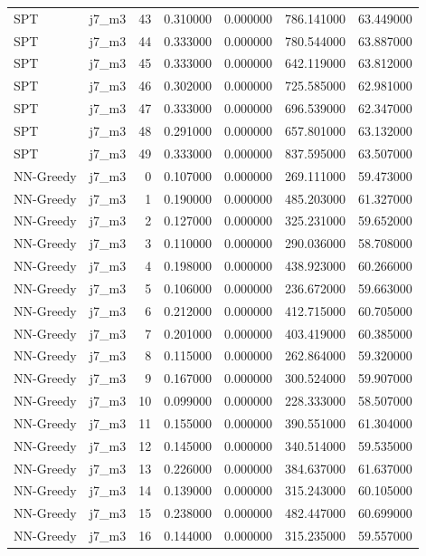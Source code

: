 \begin{tabular}{llrrrrr}
SPT & j7_m3 & 43 & 0.310000 & 0.000000 & 786.141000 & 63.449000 \\
SPT & j7_m3 & 44 & 0.333000 & 0.000000 & 780.544000 & 63.887000 \\
SPT & j7_m3 & 45 & 0.333000 & 0.000000 & 642.119000 & 63.812000 \\
SPT & j7_m3 & 46 & 0.302000 & 0.000000 & 725.585000 & 62.981000 \\
SPT & j7_m3 & 47 & 0.333000 & 0.000000 & 696.539000 & 62.347000 \\
SPT & j7_m3 & 48 & 0.291000 & 0.000000 & 657.801000 & 63.132000 \\
SPT & j7_m3 & 49 & 0.333000 & 0.000000 & 837.595000 & 63.507000 \\
NN-Greedy & j7_m3 & 0 & 0.107000 & 0.000000 & 269.111000 & 59.473000 \\
NN-Greedy & j7_m3 & 1 & 0.190000 & 0.000000 & 485.203000 & 61.327000 \\
NN-Greedy & j7_m3 & 2 & 0.127000 & 0.000000 & 325.231000 & 59.652000 \\
NN-Greedy & j7_m3 & 3 & 0.110000 & 0.000000 & 290.036000 & 58.708000 \\
NN-Greedy & j7_m3 & 4 & 0.198000 & 0.000000 & 438.923000 & 60.266000 \\
NN-Greedy & j7_m3 & 5 & 0.106000 & 0.000000 & 236.672000 & 59.663000 \\
NN-Greedy & j7_m3 & 6 & 0.212000 & 0.000000 & 412.715000 & 60.705000 \\
NN-Greedy & j7_m3 & 7 & 0.201000 & 0.000000 & 403.419000 & 60.385000 \\
NN-Greedy & j7_m3 & 8 & 0.115000 & 0.000000 & 262.864000 & 59.320000 \\
NN-Greedy & j7_m3 & 9 & 0.167000 & 0.000000 & 300.524000 & 59.907000 \\
NN-Greedy & j7_m3 & 10 & 0.099000 & 0.000000 & 228.333000 & 58.507000 \\
NN-Greedy & j7_m3 & 11 & 0.155000 & 0.000000 & 390.551000 & 61.304000 \\
NN-Greedy & j7_m3 & 12 & 0.145000 & 0.000000 & 340.514000 & 59.535000 \\
NN-Greedy & j7_m3 & 13 & 0.226000 & 0.000000 & 384.637000 & 61.637000 \\
NN-Greedy & j7_m3 & 14 & 0.139000 & 0.000000 & 315.243000 & 60.105000 \\
NN-Greedy & j7_m3 & 15 & 0.238000 & 0.000000 & 482.447000 & 60.699000 \\
NN-Greedy & j7_m3 & 16 & 0.144000 & 0.000000 & 315.235000 & 59.557000 \\

\end{tabular}
